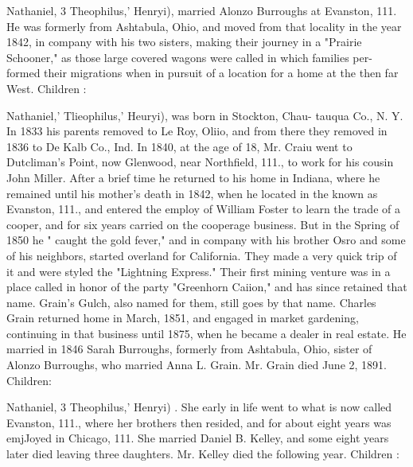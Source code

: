 \documentclass[oneside]{book}
\begin{document}
Nathaniel, 3 Theophilus,' Henryi), married Alonzo Burroughs at 
Evanston, 111. He was formerly from Ashtabula, Ohio, and 
moved from that locality in the year 1842, in company with his 
two sisters, making their journey in a "Prairie Schooner," as 
those large covered wagons were called in which families per- 
formed their migrations when in pursuit of a location for a home 
at the then far West. Children : 










Nathaniel,' Tlieophilus,' Heuryi), was born in Stockton, Chau- 
tauqua Co., N. Y. In 1833 his parents removed to Le Roy, Oliio, 
and from there they removed in 1836 to De Kalb Co., Ind. In 
1840, at the age of 18, Mr. Craiu went to Dutcliman's Point, now 
Glenwood, near Northfield, 111., to work for his cousin John Miller. 
After a brief time he returned to his home in Indiana, where he 
remained until his mother's death in 1842, when he located in the 
known as Evanston, 111., and entered the employ of William 
Foster to learn the trade of a cooper, and for six years carried 
on the cooperage business. But in the Spring of 1850 he " caught 
the gold fever," and in company with his brother Osro and some 
of his neighbors, started overland for California. They made a 
very quick trip of it and were styled the "Lightning Express." 
Their first mining venture was in a place called in honor of the 
party "Greenhorn Caiion," and has since retained that name. 
Grain's Gulch, also named for them, still goes by that name. 
Charles Grain returned home in March, 1851, and engaged in 
market gardening, continuing in that business until 1875, when 
he became a dealer in real estate. He married in 1846 Sarah 
Burroughs, formerly from Ashtabula, Ohio, sister of Alonzo 
Burroughs, who married Anna L. Grain. Mr. Grain died June 
2, 1891. Children: 












Nathaniel, 3 Theophilus,' Henryi) . She early in life went to what 
is now called Evanston, 111., where her brothers then resided, and 
for about eight years was emjJoyed in Chicago, 111. She married 
Daniel B. Kelley, and some eight years later died leaving three 
daughters. Mr. Kelley died the following year. Children : 
\end{document}
